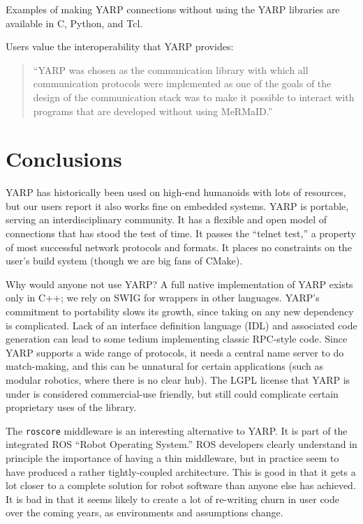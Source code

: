 \documentclass[letterpaper]{article}
\begin{document}
Examples of making YARP connections without using the YARP libraries are
available in C, Python, and Tcl.

\noindent Users value the interoperability that YARP provides:

\begin{quote}
``YARP was chosen as the communication library with
which all communication protocols were implemented as
one of the goals of the design of the communication stack
was to make it possible to interact with programs that are
developed without using MeRMaID.'' \cite{barbosa09mermaid}
\end{quote}

\section{Conclusions}

YARP has historically been used on high-end humanoids with lots of
resources, but our users report it also works fine on embedded
systems.  YARP is portable, serving an interdisciplinary community.
It has a flexible and open model of connections that has stood the
test of time.  It passes the ``telnet test,'' a property of most 
successful network protocols and formats.  It places no constraints
on the user's build system (though we are big fans of CMake).

Why would anyone not use YARP?  A full native implementation of YARP
exists only in C++; we rely on SWIG for wrappers in other languages.
YARP's commitment to portability slows its growth, since taking on any
new dependency is complicated.  Lack of an interface definition
language (IDL) and associated code generation can lead to some tedium
implementing classic RPC-style code. Since YARP supports a wide range
of protocols, it needs a central name server to do match-making, and
this can be unnatural for certain applications (such as modular
robotics, where there is no clear hub). The LGPL license that YARP is
under is considered commercial-use friendly, but still could
complicate certain proprietary uses of the library.

The {\tt roscore} middleware \cite{quigley2009ros} is an
interesting alternative to YARP.  
It is part of the integrated ROS ``Robot Operating
System.''  ROS developers clearly understand in principle the
importance of having a thin middleware, but in practice seem to have
produced a rather tightly-coupled architecture.  This is good in that
it gets a lot closer to a complete solution for robot software than
anyone else has achieved.  It is bad in that it seems likely to create
a lot of re-writing churn in user code over the coming years, as
environments and assumptions change.
\end{document}
